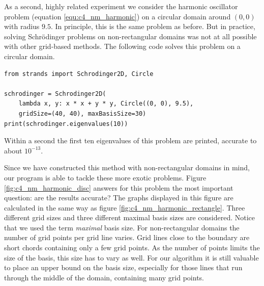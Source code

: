 As a second, highly related experiment we consider the harmonic oscillator problem (equation \eqref{equ:c4_nm_harmonic}) on a circular domain around $(0, 0)$ with radius $9.5$. In principle, this is the same problem as before. But in practice, solving Schrödinger problems on non-rectangular domains was not at all possible with other grid-based methods. The following code solves this problem on a circular domain.
\begin{verbatim}
from strands import Schrodinger2D, Circle

schrodinger = Schrodinger2D(
    lambda x, y: x * x + y * y, Circle((0, 0), 9.5),
    gridSize=(40, 40), maxBasisSize=30)
print(schrodinger.eigenvalues(10))
\end{verbatim}
Within a second the first ten eigenvalues of this problem are printed, accurate to about $10^{-13}$.

Since we have constructed this method with non-rectangular domains in mind, our program is able to tackle these more exotic problems. Figure \ref{fig:c4_nm_harmonic_disc} answers for this problem the most important question: are the results accurate? The graphs displayed in this figure are calculated in the same way as figure \ref{fig:c4_nm_harmonic_rectangle}. Three different grid sizes and three different maximal basis sizes are considered. Notice that we used the term \emph{maximal} basis size. For non-rectangular domains the number of grid points per grid line varies. Grid lines close to the boundary are short chords containing only a few grid points. As the number of points limits the size of the basis, this size has to vary as well. For our algorithm it is still valuable to place an upper bound on the basis size, especially for those lines that run through the middle of the domain, containing many grid points.

